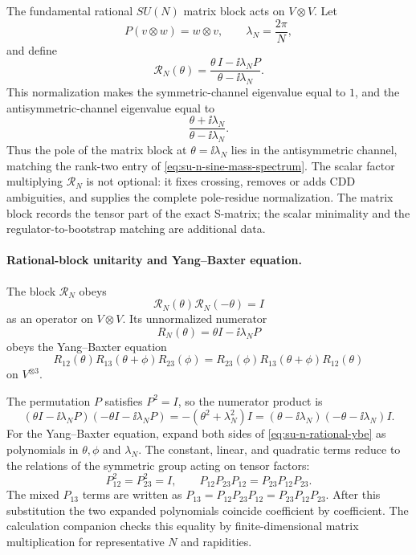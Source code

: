 The fundamental rational \(SU(N)\) matrix block acts on \(V\otimes V\).  Let
\[
  P(v\otimes w)=w\otimes v,\qquad
  \lambda_N=\frac{2\pi}{N},
\]
and define
\begin{equation}
  \mathcal R_N(\theta)
  =
  \frac{\theta\,I-\ii\lambda_N P}{\theta-\ii\lambda_N}.
  \label{eq:su-n-rational-r-block}
\end{equation}
This normalization makes the symmetric-channel eigenvalue equal to \(1\), and
the antisymmetric-channel eigenvalue equal to
\[
  \frac{\theta+\ii\lambda_N}{\theta-\ii\lambda_N}.
\]
Thus the pole of the matrix block at \(\theta=\ii\lambda_N\) lies in the
antisymmetric channel, matching the rank-two entry of
\eqref{eq:su-n-sine-mass-spectrum}.  The scalar factor multiplying
\(\mathcal R_N\) is not optional: it fixes crossing, removes or adds CDD
ambiguities, and supplies the complete pole-residue normalization.  The
matrix block records the tensor part of the exact S-matrix; the scalar
minimality and the regulator-to-bootstrap matching are additional data.

\paragraph{Rational-block unitarity and Yang--Baxter equation.}
The block \(\mathcal R_N\) obeys
\[
  \mathcal R_N(\theta)\mathcal R_N(-\theta)=I
\]
as an operator on \(V\otimes V\).  Its unnormalized numerator
\[
  R_N(\theta)=\theta I-\ii\lambda_NP
\]
obeys the Yang--Baxter equation
\begin{equation}
  R_{12}(\theta)R_{13}(\theta+\phi)R_{23}(\phi)
  =
  R_{23}(\phi)R_{13}(\theta+\phi)R_{12}(\theta)
  \label{eq:su-n-rational-ybe}
\end{equation}
on \(V^{\otimes3}\).

The permutation \(P\) satisfies \(P^2=I\), so the numerator product is
\[
  (\theta I-\ii\lambda_NP)(-\theta I-\ii\lambda_NP)
  =
  -(\theta^2+\lambda_N^2)I
  =
  (\theta-\ii\lambda_N)(-\theta-\ii\lambda_N)I .
\]
For the Yang--Baxter equation, expand both sides of
\eqref{eq:su-n-rational-ybe} as polynomials in \(\theta,\phi\) and
\(\lambda_N\).  The constant, linear, and quadratic terms reduce to the
relations of the symmetric group acting on tensor factors:
\[
  P_{12}^2=P_{23}^2=I,\qquad
  P_{12}P_{23}P_{12}=P_{23}P_{12}P_{23}.
\]
The mixed \(P_{13}\) terms are written as
\(P_{13}=P_{12}P_{23}P_{12}=P_{23}P_{12}P_{23}\).  After this substitution the
two expanded polynomials coincide coefficient by coefficient.  The
calculation companion checks this equality by finite-dimensional matrix
multiplication for representative \(N\) and rapidities.

